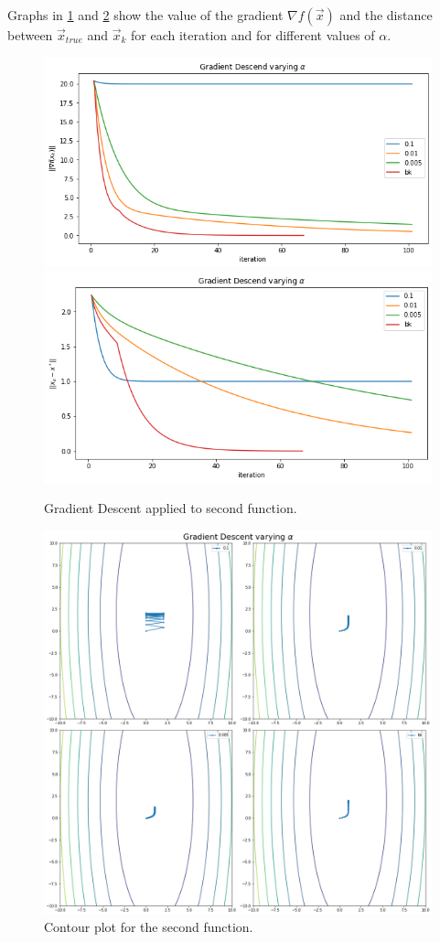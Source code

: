 \documentclass[a4paper,10pt]{report}
\begin{document}
Graphs in \ref{fig:2} and \ref{fig:2c} show the value of the gradient $\nabla f(\vec{x})$ and the distance between $\vec{x}_{true}$ and $\vec{x}_k$ for each iteration and for different values of $\alpha$.
\begin{figure}[!htb]
    \includegraphics[width=\linewidth]{2_a.png}
  \endminipage\hfill
    \includegraphics[width=\linewidth]{2_k.png}
  \endminipage\hfill
  \caption{Gradient Descent applied to second function.}
  \label{fig:2}
\end{figure}
\begin{figure}[!htb]
  \center
  \includegraphics[width=0.8\linewidth]{2_c.png}
  \caption{Contour plot for the second function.}
  \label{fig:2c}
\end{figure}
\end{document}
